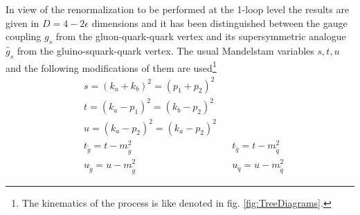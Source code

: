 In view of the renormalization to be performed at the 1-loop level the results are given in $D = 4 - 2\epsilon$ dimensions and it has been distinguished between the gauge coupling $g_s$ from the gluon-quark-quark vertex and its supersymmetric analogue $\hat{g}_s$ from the gluino-squark-quark vertex. The usual Mandelstam variables $s,t,u$ and the following modifications of them are used\footnote{The kinematics of the process is like denoted in fig. \ref{fig:TreeDiagrams}.}
\begin{align}
& s = (k_a + k_b)^2 = (p_1 + p_2)^2\nonumber\\
& t = (k_a - p_1)^2 = (k_b - p_2)^2\nonumber\\
& u = (k_a - p_2)^2 = (k_a - p_2)^2\nonumber\\
& t_{\tilde{g}} = t - m_{\tilde{g}}^2 && t_{\tilde{q}} = t- m_{\tilde{q}}^2\nonumber\\
& u_{\tilde{g}} = u - m_{\tilde{g}}^2 && u_{\tilde{q}} = u- m_{\tilde{q}}^2
\end{align}



